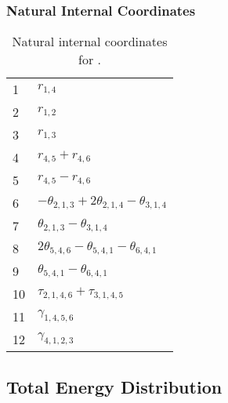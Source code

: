 \documentclass[10pt,oneside]{article}
\begin{document}
\begin{table}[h!]
\subsubsection*{Natural Internal Coordinates}
\centering
\caption{Natural internal coordinates for .}
\small
\begin{tabular}{ll}
\toprule
  1   & $r_{1,4}$ \\
  2   & $r_{1,2}$ \\
  3   & $r_{1,3}$ \\
  4   & $r_{4,5} + r_{4,6}$ \\
  5   & $r_{4,5} - r_{4,6}$ \\
  6   & $-\theta_{2,1,3} + 2\theta_{2,1,4} - \theta_{3,1,4}$ \\
  7   & $\theta_{2,1,3} - \theta_{3,1,4}$ \\
  8   & $2\theta_{5,4,6} - \theta_{5,4,1} - \theta_{6,4,1}$ \\
  9   & $\theta_{5,4,1} - \theta_{6,4,1}$ \\
  10  & $\tau_{2,1,4,6} + \tau_{3,1,4,5}$ \\
  11  & $\gamma_{1,4,5,6}$ \\
  12  & $\gamma_{4,1,2,3}$ \\
\bottomrule
\end{tabular}
\end{table}

\begin{table}
\subsection*{Total Energy Distribution}
\centering\end{table}

\clearpage

\subsection{}
\end{document}
